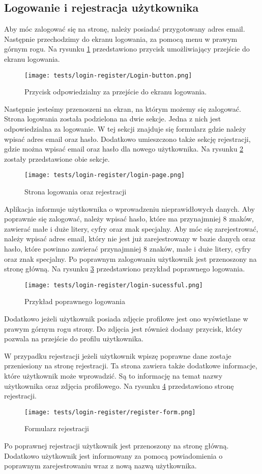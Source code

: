 \subsection{Logowanie i rejestracja użytkownika}
Aby móc zalogować się na stronę, należy posiadać przygotowany adres email. Następnie przechodzimy do ekranu logowania, za pomocą menu w prawym górnym rogu. Na rysunku \ref{login_menu} przedstawiono przycisk umożliwiający przejście do ekranu logowania.
\begin{figure}[H]
  \centering
  \texttt{[image: tests/login-register/Login-button.png]}
  \caption{Przycisk odpowiedzialny za przejście do ekranu logowania.}
  \label{login_menu}
\end{figure}
Następnie jesteśmy przenoszeni na ekran, na którym możemy się zalogować. Strona logowania została podzielona na dwie sekcje. Jedna z nich jest odpowiedzialna za logowanie. W tej sekcji znajduje się formularz gdzie należy wpisać adres email oraz hasło. Dodatkowo umieszczono także sekcję rejestracji, gdzie można wpisać email oraz hasło dla nowego użytkownika. Na rysunku \ref{login_page} zostały przedstawione obie sekcje.
\begin{figure}[H]
  \centering
  \texttt{[image: tests/login-register/login-page.png]}
  \caption{Strona logowania oraz rejestracji}
  \label{login_page}
\end{figure}
Aplikacja informuje użytkownika o wprowadzeniu nieprawidłowych danych. Aby poprawnie się zalogować, należy wpisać hasło, które ma przynajmniej 8 znaków, zawierać małe i duże litery, cyfry oraz znak specjalny. Aby móc się zarejestrować, należy wpisać adres email, który nie jest już zarejestrowany w bazie danych oraz hasło, które powinno zawierać przynajmniej 8 znaków, małe i duże litery, cyfry oraz znak specjalny. Po poprawnym zalogowaniu użytkownik jest przenoszony na stronę główną. Na rysunku \ref{login_success} przedstawiono przykład poprawnego logowania. 
\begin{figure}[H]
  \centering
  \texttt{[image: tests/login-register/login-sucessful.png]}
  \caption{Przykład poprawnego logowania}
  \label{login_success}
\end{figure}
Dodatkowo jeżeli użytkownik posiada zdjęcie profilowe jest ono wyświetlane w prawym górnym rogu strony. Do zdjęcia jest również dodany przycisk, który pozwala na przejście do profilu użytkownika.

W przypadku rejestracji jeżeli użytkownik wpiszę poprawne dane zostaje przeniesiony na stronę rejestracji. Ta strona zawiera także dodatkowe informacje, które użytkownik może wprowadzić. Są to informację na temat nazwy użytkownika oraz zdjęcia profilowego. Na rysunku \ref{register_page} przedstawiono stronę rejestracji.
\begin{figure}[H]
  \centering
  \texttt{[image: tests/login-register/register-form.png]}
  \caption{Formularz rejestracji}
  \label{register_page}
\end{figure}
Po poprawnej rejestracji użytkownik jest przenoszony na stronę główną. Dodatkowo użytkownik jest informowany za pomocą powiadomienia o poprawnym zarejestrowaniu wraz z nową nazwą użytkownika. 

